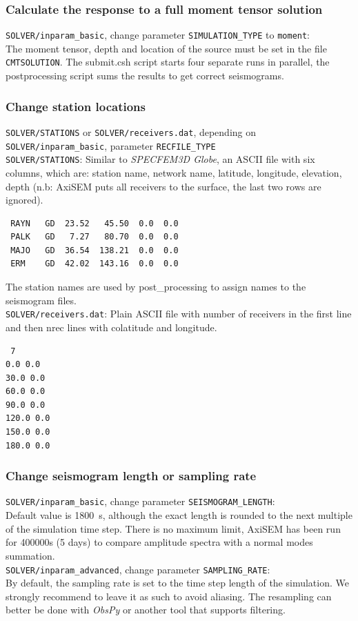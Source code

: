 \documentclass[11pt,letter,fleqn,english,notitlepage]{article}
\begin{document}
\subsubsection{Calculate the response to a full moment tensor solution}
\verb|SOLVER/inparam_basic|, change parameter \verb|SIMULATION_TYPE| to \verb|moment|:\\
The moment tensor, depth and location of the source must be set in the file \verb|CMTSOLUTION|. The submit.csh script starts four separate runs in parallel, the postprocessing script sums the results to get correct seismograms.
\subsubsection{Change station locations}
\verb|SOLVER/STATIONS| or \verb|SOLVER/receivers.dat|, depending on \verb|SOLVER/inparam_basic|, parameter \verb|RECFILE_TYPE|\\
\verb|SOLVER/STATIONS|: Similar to \textit{SPECFEM3D Globe}, an ASCII file with six columns, which are: station name, network name, latitude, longitude, elevation, depth (n.b: AxiSEM puts all receivers to the surface, the last two rows are ignored).
\begin{verbatim}
 RAYN   GD  23.52   45.50  0.0  0.0
 PALK   GD   7.27   80.70  0.0  0.0
 MAJO   GD  36.54  138.21  0.0  0.0
 ERM    GD  42.02  143.16  0.0  0.0
\end{verbatim}
The station names are used by post\_processing to assign names to the seismogram files.\\
\verb|SOLVER/receivers.dat|: Plain ASCII file with number of receivers in the first line and then nrec lines with colatitude and longitude.
\begin{verbatim}
 7
0.0 0.0
30.0 0.0
60.0 0.0
90.0 0.0
120.0 0.0
150.0 0.0
180.0 0.0
\end{verbatim}
\subsubsection{Change seismogram length or sampling rate}
\verb|SOLVER/inparam_basic|, change parameter \verb|SEISMOGRAM_LENGTH|:\\
Default value is 1800~s, although the exact length is rounded to the next multiple of the simulation time step. There is no maximum limit, AxiSEM has been run for 400000s (5 days) to compare amplitude spectra with a normal modes summation.\\
\verb|SOLVER/inparam_advanced|, change parameter \verb|SAMPLING_RATE|:\\
By default, the sampling rate is set to the time step length of the simulation. We strongly recommend to leave it as such to avoid aliasing. The resampling can better be done with \textit{ObsPy} or another tool that supports filtering.
\end{document}
